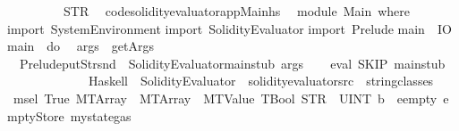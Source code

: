 \begin{isabellebody}
\ \ \ \ \ \ \ \ {\isacharplus}{\kern0pt}\ STR\ {\isacharprime}{\kern0pt}{\isacharprime}{\kern0pt}{\isasymnewline}{\isacharprime}{\kern0pt}{\isacharprime}{\kern0pt}{\isacharparenright}{\kern0pt}{\isachardoublequoteclose}\isanewline
\isanewline
{}\isamarkupfalse%
\ {\isachardoublequoteopen}code{\isacharslash}{\kern0pt}solidity{\isacharminus}{\kern0pt}evaluator{\isacharslash}{\kern0pt}app{\isacharslash}{\kern0pt}Main{\isachardot}{\kern0pt}hs{\isachardoublequoteclose}\ {\isacharequal}{\kern0pt}\ {\isacartoucheopen}\isanewline
module\ Main\ where\isanewline
import\ System{\isachardot}{\kern0pt}Environment\isanewline
import\ Solidity{\isacharunderscore}{\kern0pt}Evaluator\isanewline
import\ Prelude\isanewline
\isanewline
main\ {\isacharcolon}{\kern0pt}{\isacharcolon}{\kern0pt}\ IO\ {\isacharparenleft}{\kern0pt}{\isacharparenright}{\kern0pt}\isanewline
main\ {\isacharequal}{\kern0pt}\ do\isanewline
\ \ args\ {\isacharless}{\kern0pt}{\isacharminus}{\kern0pt}\ getArgs\isanewline
\ \ Prelude{\isachardot}{\kern0pt}putStr{\isacharparenleft}{\kern0pt}snd\ {\isachardollar}{\kern0pt}\ Solidity{\isacharunderscore}{\kern0pt}Evaluator{\isachardot}{\kern0pt}main{\isacharunderscore}{\kern0pt}stub\ args{\isacharparenright}{\kern0pt}\ \isanewline
{\isacartoucheclose}\isanewline
\isanewline
{}\isamarkupfalse%
\ {\isacharunderscore}{\kern0pt}\isanewline
\isanewline
{}\isamarkupfalse%
\ eval{}\ SKIP\ main{\isacharunderscore}{\kern0pt}stub\isanewline
\ \ \ \ \ \ \ \ \ \ \ \ \ Haskell\ \ {\isachardoublequoteopen}Solidity{\isacharunderscore}{\kern0pt}Evaluator{\isachardoublequoteclose}\ \ {\isachardoublequoteopen}solidity{\isacharminus}{\kern0pt}evaluator{\isacharslash}{\kern0pt}src{\isachardoublequoteclose}\ \ {\isacharparenleft}{\kern0pt}string{\isacharunderscore}{\kern0pt}classes{\isacharparenright}{\kern0pt}%
\isadelimdocument
%
\endisadelimdocument
%
\isatagdocument
%
\isamarkuptrue%
%
\isamarkuptrue%
%
\endisatagdocument
{\isafolddocument}%
%
\isadelimdocument
%
\endisadelimdocument
{}\isamarkupfalse%
\ {\isachardoublequoteopen}msel\ True\ {\isacharparenleft}{\kern0pt}MTArray\ {}\ {\isacharparenleft}{\kern0pt}MTArray\ {}\ {\isacharparenleft}{\kern0pt}MTValue\ TBool{\isacharparenright}{\kern0pt}{\isacharparenright}{\kern0pt}{\isacharparenright}{\kern0pt}\ {\isacharparenleft}{\kern0pt}STR\ {\isacharprime}{\kern0pt}{\isacharprime}{\kern0pt}{}{\isacharprime}{\kern0pt}{\isacharprime}{\kern0pt}{\isacharparenright}{\kern0pt}\ {\isacharbrackleft}{\kern0pt}UINT\ b{}\ {}{\isacharbrackright}{\kern0pt}\ eempty\ emptyStore\ {\isacharparenleft}{\kern0pt}mystate{\isasymlparr}gas{\isacharcolon}{\kern0pt}{\isacharequal}{\kern0pt}{}{\isasymrparr}{\isacharparenright}{\kern0pt}\ {}\isanewline

\end{isabellebody}
